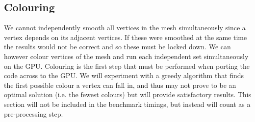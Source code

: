 \subsection{Colouring}
We cannot independently smooth all vertices in the mesh simultaneously since a vertex depends on its adjacent vertices. If these were smoothed at the same time the results would not be correct and so these must be locked down. We can however colour vertices of the mesh and run each independent set simultaneously on the GPU.
Colouring is the first step that must be performed when porting the code across to the GPU.
We will experiment with a greedy algorithm that finds the first possible colour a vertex can fall in, and thus may not prove to be an optimal solution (i.e. the fewest colours) but will provide satisfactory results.
This section will not be included in the benchmark timings, but instead will count as a pre-processing step.
